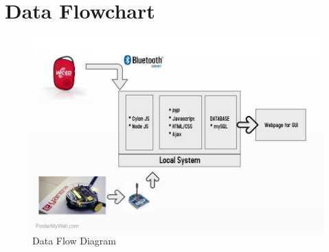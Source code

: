 \documentclass[a4paper,12pt,oneside]{book}
\begin{document}
\section{Data Flowchart}
  \begin{figure}[h]
        \centering
    	\includegraphics[scale=0.5]{Flowchart.jpg}
    	\caption{Data Flow Diagram}
	    \end{figure}
\end{document}
